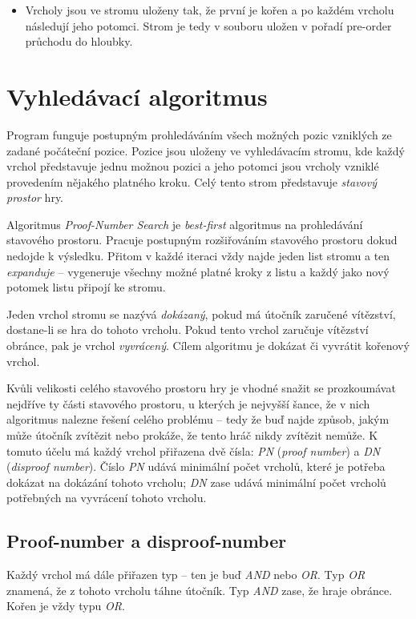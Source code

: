 \documentclass{article}
\begin{document}
\begin{itemize}
  \item Vrcholy jsou ve stromu uloženy tak, že první je kořen a po každém vrcholu následují jeho potomci. Strom je tedy
  v souboru uložen v pořadí pre-order průchodu do hloubky.
\end{itemize}

\section{Vyhledávací algoritmus}
Program funguje postupným prohledáváním všech možných pozic vzniklých ze zadané počáteční pozice. Pozice jsou uloženy ve
vyhledávacím stromu, kde každý vrchol představuje jednu možnou pozici a jeho potomci jsou vrcholy vzniklé provedením
nějakého platného kroku. Celý tento strom představuje \emph{stavový prostor} hry.

Algoritmus \emph{Proof-Number Search} je \emph{best-first} algoritmus na prohledávání stavového prostoru. Pracuje
postupným rozšiřováním stavového prostoru dokud nedojde k výsledku. Přitom v každé iteraci vždy najde jeden list stromu
a ten \emph{expanduje} -- vygeneruje všechny možné platné kroky z listu a každý jako nový potomek listu připojí ke
stromu.

Jeden vrchol stromu se nazývá \emph{dokázaný}, pokud má útočník zaručené vítězství, dostane-li se hra do tohoto
vrcholu. Pokud tento vrchol zaručuje vítězství obránce, pak je vrchol \emph{vyvrácený}. Cílem algoritmu je dokázat či
vyvrátit kořenový vrchol.

Kvůli velikosti celého stavového prostoru hry je vhodné snažit se prozkoumávat nejdříve ty části stavového prostoru, u
kterých je nejvyšší šance, že v nich algoritmus nalezne řešení celého problému -- tedy že buď najde způsob, jakým může
útočník zvítězit nebo prokáže, že tento hráč nikdy zvítězit nemůže. K tomuto účelu má každý vrchol přiřazena dvě
čísla: \emph{PN} (\emph{proof number}) a \emph{DN} (\emph{disproof number}). Číslo \emph{PN} udává minimální počet
vrcholů, které je potřeba dokázat na dokázání tohoto vrcholu; \emph{DN} zase udává minimální počet vrcholů potřebných na
vyvrácení tohoto vrcholu.

\subsection{Proof-number a disproof-number}
Každý vrchol má dále přiřazen typ -- ten je buď \emph{AND} nebo \emph{OR}. Typ \emph{OR} znamená, že z tohoto vrcholu
táhne útočník. Typ \emph{AND} zase, že hraje obránce. Kořen je vždy typu \emph{OR}.
\end{document}
